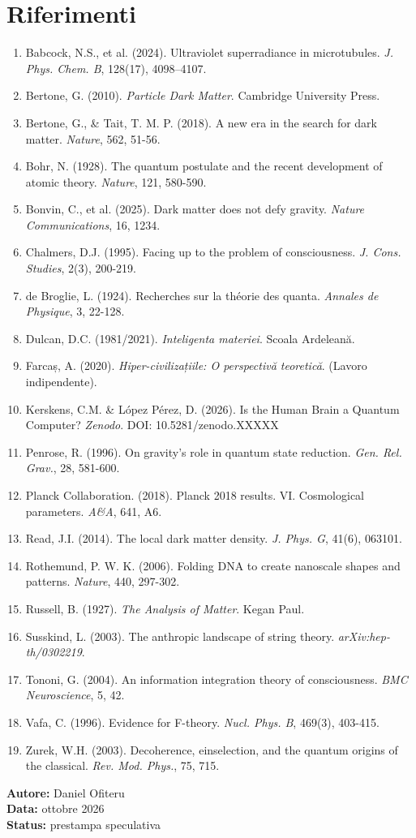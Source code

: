 \documentclass[11pt,a4paper]{article}
\begin{document}
\section*{Riferimenti}
\begin{enumerate}
    \item Babcock, N.S., et al. (2024). Ultraviolet superradiance in microtubules. \textit{J. Phys. Chem. B}, 128(17), 4098--4107.
    \item Bertone, G. (2010). \textit{Particle Dark Matter}. Cambridge University Press.
    \item Bertone, G., \& Tait, T. M. P. (2018). A new era in the search for dark matter. \textit{Nature}, 562, 51-56.
    \item Bohr, N. (1928). The quantum postulate and the recent development of atomic theory. \textit{Nature}, 121, 580-590.
    \item Bonvin, C., et al. (2025). Dark matter does not defy gravity. \textit{Nature Communications}, 16, 1234.
    \item Chalmers, D.J. (1995). Facing up to the problem of consciousness. \textit{J. Cons. Studies}, 2(3), 200-219.
    \item de Broglie, L. (1924). Recherches sur la théorie des quanta. \textit{Annales de Physique}, 3, 22-128.
    \item Dulcan, D.C. (1981/2021). \textit{Inteligenta materiei}. Scoala Ardeleană.
    \item Farcaș, A. (2020). \textit{Hiper-civilizațiile: O perspectivă teoretică}. (Lavoro indipendente).
    \item Kerskens, C.M. \& López Pérez, D. (2026). Is the Human Brain a Quantum Computer? \textit{Zenodo}. DOI: 10.5281/zenodo.XXXXX
    \item Penrose, R. (1996). On gravity's role in quantum state reduction. \textit{Gen. Rel. Grav.}, 28, 581-600.
    \item Planck Collaboration. (2018). Planck 2018 results. VI. Cosmological parameters. \textit{A\&A}, 641, A6.
    \item Read, J.I. (2014). The local dark matter density. \textit{J. Phys. G}, 41(6), 063101.
    \item Rothemund, P. W. K. (2006). Folding DNA to create nanoscale shapes and patterns. \textit{Nature}, 440, 297-302.
    \item Russell, B. (1927). \textit{The Analysis of Matter}. Kegan Paul.
    \item Susskind, L. (2003). The anthropic landscape of string theory. \textit{arXiv:hep-th/0302219}.
    \item Tononi, G. (2004). An information integration theory of consciousness. \textit{BMC Neuroscience}, 5, 42.
    \item Vafa, C. (1996). Evidence for F-theory. \textit{Nucl. Phys. B}, 469(3), 403-415.
    \item Zurek, W.H. (2003). Decoherence, einselection, and the quantum origins of the classical. \textit{Rev. Mod. Phys.}, 75, 715.
\end{enumerate}

\vspace{1cm}
\begin{flushright}
\textbf{Autore:} Daniel Ofiteru \\
\textbf{Data:} ottobre 2026 \\
\textbf{Status:} prestampa speculativa
\end{flushright}
\end{document}
